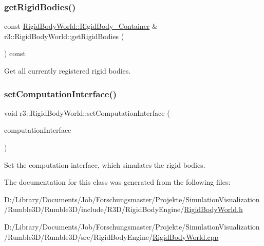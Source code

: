 \subsubsection{\texorpdfstring{get\+Rigid\+Bodies()}{getRigidBodies()}\hspace{0.1cm}{\footnotesize\ttfamily [2/2]}}
{\footnotesize\ttfamily const \mbox{\hyperlink{classr3_1_1_rigid_body_world_abe8c123eee198b6f8eca079e71302bcb}{Rigid\+Body\+World\+::\+Rigid\+Body\+\_\+\+Container}} \& r3\+::\+Rigid\+Body\+World\+::get\+Rigid\+Bodies (\begin{DoxyParamCaption}{ }\end{DoxyParamCaption}) const}

Get all currently registered rigid bodies. \mbox{\label{classr3_1_1_rigid_body_world_a0c5724007917231ebe9bd970d65b0bfe}} 
\subsubsection{\texorpdfstring{set\+Computation\+Interface()}{setComputationInterface()}}
{\footnotesize\ttfamily void r3\+::\+Rigid\+Body\+World\+::set\+Computation\+Interface (\begin{DoxyParamCaption}\item[{\mbox{\hyperlink{classr3_1_1_rigid_body_engine_c_i}{Rigid\+Body\+Engine\+CI}} $\ast$}]{computation\+Interface }\end{DoxyParamCaption})}

Set the computation interface, which simulates the rigid bodies. 

The documentation for this class was generated from the following files\+:\begin{DoxyCompactItemize}
\item 
D\+:/\+Library/\+Documents/\+Job/\+Forschungsmaster/\+Projekte/\+Simulation\+Visualization/\+Rumble3\+D/\+Rumble3\+D/include/\+R3\+D/\+Rigid\+Body\+Engine/\mbox{\hyperlink{_rigid_body_world_8h}{Rigid\+Body\+World.\+h}}\item 
D\+:/\+Library/\+Documents/\+Job/\+Forschungsmaster/\+Projekte/\+Simulation\+Visualization/\+Rumble3\+D/\+Rumble3\+D/src/\+Rigid\+Body\+Engine/\mbox{\hyperlink{_rigid_body_world_8cpp}{Rigid\+Body\+World.\+cpp}}\end{DoxyCompactItemize}
